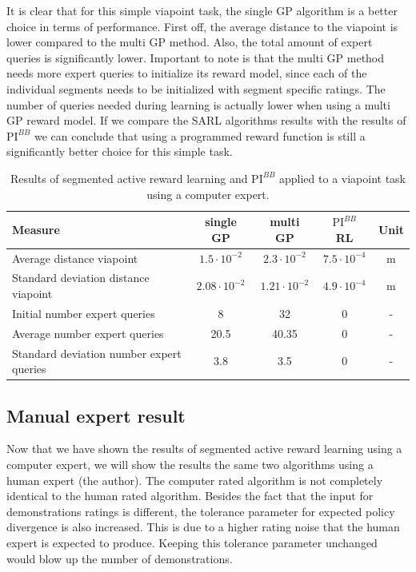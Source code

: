 \documentclass[mscThesis.tex]{subfiles}
\begin{document}
It is clear that for this simple viapoint task, the single GP algorithm is a better choice in terms of performance. First off, the average distance to the viapoint is lower compared to the multi GP method. Also, the total amount of expert queries is significantly lower. Important to note is that the multi GP method needs more expert queries to initialize its reward model, since each of the individual segments needs to be initialized with segment specific ratings. The number of queries needed during learning is actually lower when using a multi GP reward model. If we compare the SARL algorithms results with the results of $\text{PI}^{BB}$ we can conclude that using a programmed reward function is still a significantly better choice for this simple task.

\begin{table}[!htb]
    \centering
    \caption{Results of segmented active reward learning and $\text{PI}^{BB}$ applied to a viapoint task using a computer expert.}
    \label{tab:vp-com}
    \begin{tabular}{|p{6cm}|c|c|c|c|}
        \hline
        Measure & single GP & multi GP & $\text{PI}^{BB}$ RL & Unit \\ \hline \hline
        Average distance viapoint & $1.5 \cdot 10^{-2}$ & $2.3 \cdot 10^{-2}$ & $7.5 \cdot 10^{-4}$ & \si{m}  \\ \hline
        Standard deviation distance viapoint & $2.08 \cdot 10^{-2}$ & $1.21 \cdot 10^{-2}$ & $4.9 \cdot 10^{-4}$ & \si{m} \\ \hline
        Initial number expert queries & 8 & 32 & 0 & - \\ \hline
        Average number expert queries & 20.5 & 40.35 & 0 &  - \\ \hline
        Standard deviation number expert queries & 3.8 & 3.5 & 0 &  - \\ \hline 
    \end{tabular}
\end{table}

\clearpage

\subsection{Manual expert result}
Now that we have shown the results of segmented active reward learning using a computer expert, we will show the results the same two algorithms using a human expert (the author). The computer rated algorithm is not completely identical to the human rated algorithm. Besides the fact that the input for demonstrations ratings is different, the tolerance parameter for expected policy divergence is also increased. This is due to a higher rating noise that the human expert is expected to produce. Keeping this tolerance parameter unchanged would blow up the number of demonstrations. 
\end{document}
